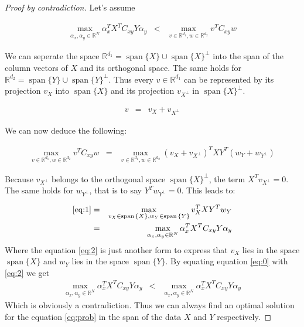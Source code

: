 \documentclass[a4paper, 12pt, titlepage]{article}
\DeclareMathOperator{\spanop}{span}
\begin{document}
\begin{proof}[Proof by contradiction]
Let's assume

\begin{eqnarray}
	\max_{\alpha_x, \alpha_y \in \mathbb{R}^{N}} \alpha_x^TX^TC_{xy}Y\alpha_y &<&
	\max_{v \in \mathbb{R}^{d_1}, w\in \mathbb{R}^{d_2}} v^T C_{xy} w \label{eq:0}
\end{eqnarray}

We can seperate the space $\mathbb{R}^{d_1} = \spanop{\{X\}} \cup \spanop{\{X\}}^\bot$ into the span of the column vectors of $X$ and its orthogonal space.
The same holds for $\mathbb{R}^{d_2} = \spanop{\{Y\}} \cup \spanop{\{Y\}}^\bot$.
Thus every $v\in \mathbb{R}^{d_1}$ can be represented by its projection $v_{X}$ into $\spanop{\{X\}}$ and its projection $v_{X^\bot}$ in $\spanop{\{X\}}^\bot$.

\begin{eqnarray*}
	v &=& v_{X} + v_{X^\bot}
\end{eqnarray*}

We can now deduce the following:

\begin{eqnarray}
	\max_{v \in \mathbb{R}^{d_1}, w\in \mathbb{R}^{d_2}} v^T C_{xy} w &=&
	\max_{v \in \mathbb{R}^{d_1}, w\in \mathbb{R}^{d_2}} \left(v_{X} + v_{X^\bot} \right)^T XY^T\left(w_{Y} + w_{Y^\bot} \right) \label{eq:1}
\end{eqnarray}

Because $v_{X^\bot}$ belongs to the orthogonal space $\spanop{\{X\}}^\bot$, the term $X^Tv_{X^\bot}=0$.
The same holds for $w_{Y^\bot}$, that is to say $Y^Tw_{Y^\bot}=0$.
This leads to:

\begin{eqnarray}
	\eqref{eq:1} &=& \max_{v_X \in \spanop{\{X\}}, w_Y \in \spanop{\{Y\}}} v_X^TXY^Tw_Y \nonumber\\
	&=& \max_{\alpha_x,\alpha_y \in \mathbb{R}^N} \alpha_x^TX^TC_{xy}Y\alpha_y \label{eq:2}
\end{eqnarray}
Where the equation \eqref{eq:2} is just another form to express that $v_X$ lies in the space $\spanop{\{X\}}$ and $w_Y$ lies in the space $\spanop{\{Y\}}$.
By equating equation \eqref{eq:0} with \eqref{eq:2} we get
\begin{eqnarray*}
	\max_{\alpha_x, \alpha_y \in \mathbb{R}^{N}} \alpha_x^TX^TC_{xy}Y\alpha_y &<&
	\max_{\alpha_x,\alpha_y \in \mathbb{R}^N} \alpha_x^TX^TC_{xy}Y\alpha_y
\end{eqnarray*}
Which is obviously a contradiction.
Thus we can always find an optimal solution for the equation \eqref{eq:prob} in the span of the data $X$ and $Y$ respectively.
\end{proof}
\end{document}
